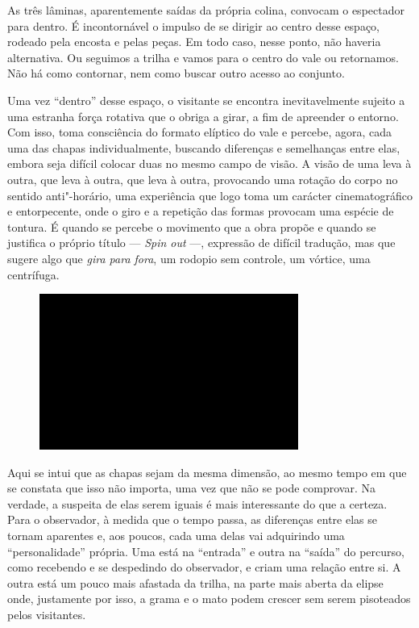 As três lâminas, aparentemente saídas da própria colina, convocam o
espectador para dentro. É incontornável o impulso de se dirigir ao
centro desse espaço, rodeado pela encosta e pelas peças. Em todo caso,
nesse ponto, não haveria alternativa. Ou seguimos a trilha e vamos para
o centro do vale ou retornamos. Não há como contornar, nem como buscar
outro acesso ao conjunto.

Uma vez ``dentro'' desse espaço, o visitante se encontra inevitavelmente
sujeito a uma estranha força rotativa que o obriga a girar, a fim de
apreender o entorno. Com isso, toma consciência do formato elíptico do
vale e percebe, agora, cada uma das chapas individualmente, buscando
diferenças e semelhanças entre elas, embora seja difícil colocar duas no
mesmo campo de visão. A visão de uma leva à outra, que leva à outra, que
leva à outra, provocando uma rotação do corpo no sentido anti"-horário,
uma experiência que logo toma um carácter cinematográfico e
entorpecente, onde o giro e a repetição das formas provocam uma espécie
de tontura. É quando se percebe o movimento que a obra propõe e quando
se justifica o próprio título --- \emph{Spin out} ---, expressão de
difícil tradução, mas que sugere algo que \emph{gira para fora}, um
rodopio sem controle, um vórtice, uma centrífuga.

\begin{figure}[!ht]
\centering
 \includegraphics[width=85mm]{./imgs/im1.jpg}
\caption{\tiny{}}
\end{figure}

Aqui se intui que as chapas sejam da mesma dimensão, ao mesmo tempo em
que se constata que isso não importa, uma vez que não se pode comprovar.
Na verdade, a suspeita de elas serem iguais é mais interessante do que a
certeza. Para o observador, à medida que o tempo passa, as diferenças
entre elas se tornam aparentes e, aos poucos, cada uma delas vai
adquirindo uma ``personalidade'' própria. Uma está na ``entrada'' e
outra na ``saída'' do percurso, como recebendo e se despedindo do
observador, e criam uma relação entre si. A outra está um pouco mais
afastada da trilha, na parte mais aberta da elipse onde, justamente por
isso, a grama e o mato podem crescer sem serem pisoteados pelos
visitantes.

